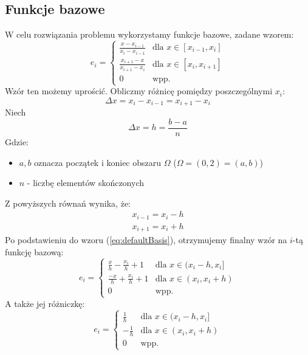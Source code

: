 \documentclass[12pt]{article}
\begin{document}
\subsection{Funkcje bazowe}
W celu rozwiązania problemu wykorzystamy funkcje bazowe, zadane wzorem:
\begin{equation} \label{eq:defaultBasis}
    e_i = \begin{cases}
        \frac{x - x_{i-1}}{x_i - x_{i-1}} & \text{dla } x \in [x_{i-1}, x_i] \\
        \frac{x_{i+1} - x}{x_{i+1} - x_i} & \text{dla } x \in [x_i, x_{i+1}] \\
        0 & \text{wpp.}
    \end{cases}
\end{equation}
% 
Wzór ten możemy uprościć. Obliczmy różnicę pomiędzy poszczególnymi $x_i$:
\begin{equation}
    \Delta x = x_i - x_{i-1} = x_{i+1} - x_i
\end{equation}
% 
Niech
\begin{equation}
    \Delta x = h = \frac{b - a}{n}
\end{equation}
Gdzie:
\begin{itemize}
    \item $a,b$ oznacza początek i koniec obszaru $\Omega$ ($\Omega = (0,2) = (a,b)$)
    \item $n$ - liczbę elementów skończonych
\end{itemize}
% 
Z powyższych równań wynika, że: 
\begin{gather}
    x_{i-1} = x_i - h \\
    x_{i+1} = x_i + h
\end{gather}
% 
Po podstawieniu do wzoru (\ref{eq:defaultBasis}), otrzymujemy finalny wzór na $i$-tą funkcję bazową:
\begin{equation}
    e_i = \begin{cases}
        \frac{x}{h} - \frac{x_i}{h} + 1 & \text{dla } x \in (x_i - h, x_i] \\
        \frac{-x}{h} + \frac{x_i}{h} + 1 & \text{dla } x \in (x_i, x_i+h) \\
        0 & \text{wpp.}
    \end{cases}
\end{equation}
% 
A także jej różniczkę:
\begin{equation}
    e_i = \begin{cases}
        \frac{1}{h} & \text{dla } x \in (x_i - h, x_i] \\
        -\frac{1}{h} & \text{dla } x \in (x_i, x_i+h) \\
        0 & \text{wpp.}
    \end{cases}
\end{equation}
\end{document}
